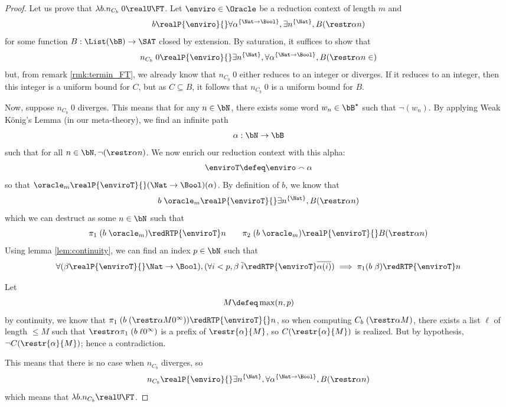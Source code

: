 \begin{proof}
  Let us prove that $\lambda b. n_{C_b}\;0 \realU\FT$. Let $\enviro\in\Oracle$ be a reduction context of length $m$ and
  \[b \realP{\enviro}{} \forall \alpha^{\{\Nat \to \Bool\}}, \exists n^{\{\Nat\}}, B(\restr \alpha n)\]
  for some function $B : \List(\bB) \to \SAT$ closed by extension. By saturation, it suffices to show that
  \[n_{C_b}\;0 \realP{\enviro}{} \exists n^{\{\Nat\}}, \forall \alpha^{\{\Nat \to \Bool\}}, B(\restr\alpha n \in)\]
  but, from remark \ref{rmk:termin_FT}, we already know that $n_{C_b}\;0$ either reduces to an integer or diverges. If it reduces to an integer, then this integer is a uniform bound for $C$, but as $C \subseteq B$, it follows that $n_{C_b}\;0$ is a uniform bound for $B$.

  Now, suppose $n_{C_b}\;0$ diverges. This means that for any $n \in \bN$, there exists some word $w_n \in \bB^\star$ such that $\lnot(w_n)$. By applying Weak König's Lemma (in our meta-theory), we find an infinite path
  \[\alpha : \bN \to \bB\]
  such that for all $n \in \bN, \lnot(\restr \alpha n)$. We now enrich our reduction context with this alpha:
  \[\enviroT \defeq \enviro \smallfrown \alpha\]
  so that $\oracle_m \realP{\enviroT}{} (\Nat \to \Bool)(\alpha)$. By definition of $b$, we know that
  \[b\;\oracle_m\realP{\enviroT}{} \exists n^{\{\Nat\}}, B(\restr \alpha n)\]
  which we can destruct as some $n \in \bN$ such that
  \[\pi_1\;(b\;\oracle_m) \redRTP{\enviroT} n \qquad \pi_2\;(b\;\oracle_m)\realP{\enviroT}{} B(\restr \alpha n)\]
  Using lemma \ref{lem:continuity}, we can find an index $p\in \bN$ such that
  \[\forall (\beta \realP{\enviroT}{} \Nat \to \Bool), (\forall i < p, \beta\;\overline i \redRTP{\enviroT} \overline{\alpha(i)}) \implies \pi_1(b\;\beta) \redRTP{\enviroT} n\]

  Let
  \[M \defeq \max(n,p)\]
  by continuity, we know that $\pi_1\;(b\;(\restr \alpha M 0^\infty)) \redRTP{\enviroT}{} n$, so when computing $C_b\;(\restr\alpha M)$, there exists a list $\ell$ of length $\leq M$ such that $\restr\alpha{{\pi_1\;(b\;\ell 0^\infty)}}$ is a prefix of $\restr{\alpha}{M}$, so $C(\restr{\alpha}{M})$ is realized. But by hypothesis, $\lnot C(\restr{\alpha}{M})$; hence a contradiction.

  This means that there is no case when $n_{C_b}$ diverges, so
  \[n_{C_b}\realP{\enviro}{} \exists n^{\{\Nat\}}, \forall \alpha^{\{\Nat \to \Bool\}}, B(\restr\alpha n)\]
  which means that $\lambda b.n_{C_b}\realU \FT$.
\end{proof}

